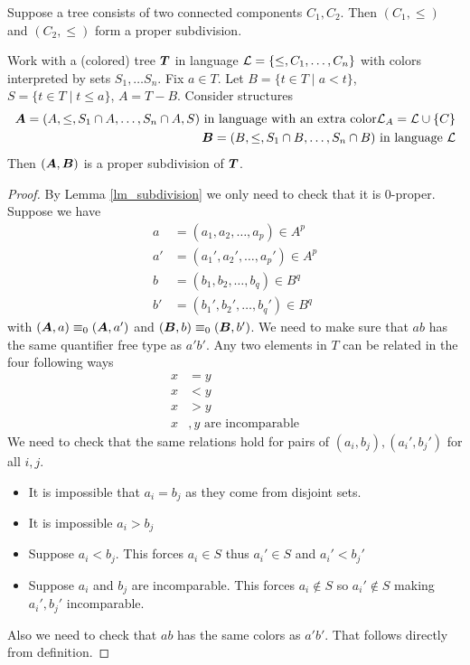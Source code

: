 \documentclass{amsart}
\DeclareMathOperator{\TT}{\boldface T}
\DeclareMathOperator{\A}{\boldface A}
\DeclareMathOperator{\B}{\boldface B}
\begin{document}
\begin{Example}
	Suppose a tree consists of two connected components $C_1, C_2$. Then $(C_1, \leq)$ and $(C_2, \leq)$ form a proper subdivision.
\end{Example}

\begin{Example} \label{ex_cone}
	Work with a (colored) tree $\TT$ in language $\mathcal L = \{\leq, C_1, \ldots, C_n\}$ with colors interpreted by sets $S_1, \ldots S_n$. Fix $a \in T$. Let $B = \{t \in T \mid a < t\}$, $S = \{t \in T \mid t \leq a\}$, $A = T - B$. Consider structures
	\begin{align*}
		\A = (A, \leq, S_1 \cap A, \ldots, S_n \cap A, S) \text{ in language with an extra color} \LL_A = \LL \cup \{C\} \\
		\B = (B, \leq, S_1 \cap B, \ldots, S_n \cap B) \text{ in language } \LL
	\end{align*}
	Then $(\A, \B)$ is a proper subdivision of $\TT$.
\end{Example}

\begin{proof}
	By Lemma \ref{lm_subdivision} we only need to check that it is $0$-proper. Suppose we have 
	\begin{align*}
		a &= (a_1, a_2, \ldots, a_p) \in A^p \\
		a' &= (a_1', a_2', \ldots, a_p') \in A^p  \\
		b &= (b_1, b_2, \ldots, b_q) \in B^q  \\
		b' &= (b_1', b_2', \ldots, b_q') \in B^q 
	\end{align*}
	with $(\A, a) \equiv_0 (\A, a')$ and $(\B, b) \equiv_0 (\B, b')$. We need to make sure that $ab$ has the same quantifier free type as $a'b'$. Any two elements in $T$ can be related in the four following ways
	\begin{align*}
		x &= y \\
		x &< y \\
		x &> y \\
		x&,y \text{ are incomparable}
	\end{align*}
	We need to check that the same relations hold for pairs of $(a_i, b_j), (a_i', b_j')$ for all $i,j$.
	
	\begin{itemize}
		\item It is impossible that $a_i = b_j$ as they come from disjoint sets.
		\item It is impossible $a_i > b_j$
		\item Suppose $a_i < b_j$. This forces $a_i \in S$ thus $a_i' \in S$ and $a_i' < b_j'$ 
		\item Suppose $a_i$ and $b_j$ are incomparable. This forces $a_i \notin S$ so $a_i' \notin S$ making $a_i', b_j'$ incomparable.
	\end{itemize}
	Also we need to check that $ab$ has the same colors as $a'b'$. That follows directly from definition.
\end{proof}
\end{document}
